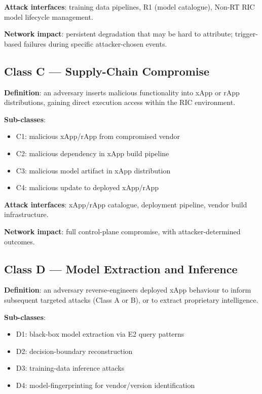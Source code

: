 \documentclass[sigconf,nonacm]{acmart}
\begin{document}
\textbf{Attack interfaces}: training data pipelines, R1 (model
catalogue), Non-RT RIC model lifecycle management.

\textbf{Network impact}: persistent degradation that may be
hard to attribute; trigger-based failures during specific
attacker-chosen events.

\subsection{Class C --- Supply-Chain Compromise}

\textbf{Definition}: an adversary inserts malicious functionality
into xApp or rApp distributions, gaining direct execution access
within the RIC environment.

\textbf{Sub-classes}:
\begin{itemize}
  \item C1: malicious xApp/rApp from compromised vendor
  \item C2: malicious dependency in xApp build pipeline
  \item C3: malicious model artifact in xApp distribution
  \item C4: malicious update to deployed xApp/rApp
\end{itemize}

\textbf{Attack interfaces}: xApp/rApp catalogue, deployment
pipeline, vendor build infrastructure.

\textbf{Network impact}: full control-plane compromise, with
attacker-determined outcomes.

\subsection{Class D --- Model Extraction and Inference}

\textbf{Definition}: an adversary reverse-engineers deployed xApp
behaviour to inform subsequent targeted attacks (Class A or B),
or to extract proprietary intelligence.

\textbf{Sub-classes}:
\begin{itemize}
  \item D1: black-box model extraction via E2 query patterns
  \item D2: decision-boundary reconstruction
  \item D3: training-data inference attacks
  \item D4: model-fingerprinting for vendor/version identification
\end{itemize}
\end{document}

